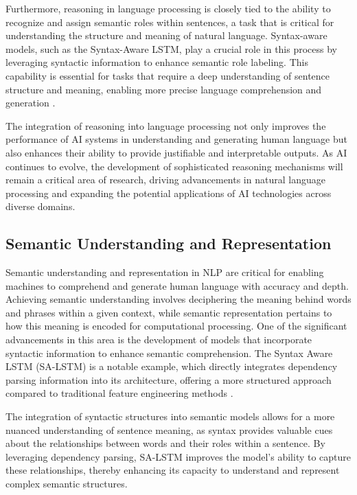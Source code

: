 Furthermore, reasoning in language processing is closely tied to the ability to recognize and assign semantic roles within sentences, a task that is critical for understanding the structure and meaning of natural language. Syntax-aware models, such as the Syntax-Aware LSTM, play a crucial role in this process by leveraging syntactic information to enhance semantic role labeling. This capability is essential for tasks that require a deep understanding of sentence structure and meaning, enabling more precise language comprehension and generation \cite{qian2017syntaxawarelstmmodel}.



The integration of reasoning into language processing not only improves the performance of AI systems in understanding and generating human language but also enhances their ability to provide justifiable and interpretable outputs. As AI continues to evolve, the development of sophisticated reasoning mechanisms will remain a critical area of research, driving advancements in natural language processing and expanding the potential applications of AI technologies across diverse domains.



\subsection{Semantic Understanding and Representation} \label{subsec:Semantic Understanding and Representation}



Semantic understanding and representation in NLP are critical for enabling machines to comprehend and generate human language with accuracy and depth. Achieving semantic understanding involves deciphering the meaning behind words and phrases within a given context, while semantic representation pertains to how this meaning is encoded for computational processing. One of the significant advancements in this area is the development of models that incorporate syntactic information to enhance semantic comprehension. The Syntax Aware LSTM (SA-LSTM) is a notable example, which directly integrates dependency parsing information into its architecture, offering a more structured approach compared to traditional feature engineering methods \cite{qian2017syntaxawarelstmmodel}.



The integration of syntactic structures into semantic models allows for a more nuanced understanding of sentence meaning, as syntax provides valuable cues about the relationships between words and their roles within a sentence. By leveraging dependency parsing, SA-LSTM improves the model's ability to capture these relationships, thereby enhancing its capacity to understand and represent complex semantic structures.



